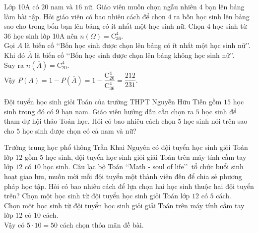 \begin{bt}%
    Lớp 10A có $ 20 $ nam và $ 16 $ nữ. Giáo viên muốn chọn ngẫu nhiên $ 4 $ bạn lên bảng làm bài tập. Hỏi giáo viên có bao nhiêu cách để chọn $ 4 $ ra bốn học sinh lên bảng sao cho trong bốn bạn lên bảng có ít nhất một học sinh nữ.
    \loigiai
    {
        Chọn $ 4 $ học sinh từ $ 36 $ học sinh lớp 10A nên $ n(\Omega)=\mathrm{C}_{36}^4 $.\\
        Gọi $ A $ là biến cố \lq\lq Bốn học sinh được chọn lên bảng có ít nhất một học sinh nữ\rq\rq.\\
        Khi đó $ \overline{A} $ là biến cố \lq\lq Bốn học sinh được chọn lên bảng không học sinh nữ\rq\rq.\\
        Suy ra $ n(\overline{A} ) =\mathrm{C}_{20}^4$.\\
        Vậy $ P(A)=1-P(\overline{A})=1-\dfrac{\mathrm{C}_{20}^4}{\mathrm{C}_{36}^4 }=\dfrac{212}{231} $.
    }
\end{bt}

\begin{bt}%
	Đội tuyển học sinh giỏi Toán của trường THPT Nguyễn Hữu Tiến gồm $15$ học sinh trong đó có $9$ bạn nam. Giáo viên hướng dẫn cần chọn ra $5$ học sinh để tham dự hội thảo Toán học. Hỏi có bao nhiêu cách chọn $5$ học sinh nói trên sao cho $5$ học sinh được chọn có cả nam và nữ?
\end{bt}

\begin{bt}%
	Trường trung học phổ thông Trần Khai Nguyên có đội tuyển học sinh giỏi Toán lớp $12$ gồm $5$ học sinh, đội tuyển học sinh giỏi giải Toán trên máy tính cầm tay lớp $12$ có $10$ học sinh. Câu lạc bộ Toán \lq\lq Math - soul of life\rq\rq\ tổ chức buổi sinh hoạt giao lưu, muốn mời mỗi đội tuyển một thành viên đến để chia sẻ phương pháp học tập. Hỏi có bao nhiêu cách để lựa chọn hai học sinh thuộc hai đội tuyển trên?
	\loigiai
	{
		Chọn một học sinh từ đội tuyển học sinh giỏi Toán lớp $12$ có $5$ cách.\\
		Chọn một học sinh từ đội tuyển học sinh giỏi giải Toán trên máy tính cầm tay lớp $12$ có $10$ cách.\\
		Vậy có $5\cdot 10=50$ cách chọn thỏa mãn đề bài.
	}
\end{bt}

